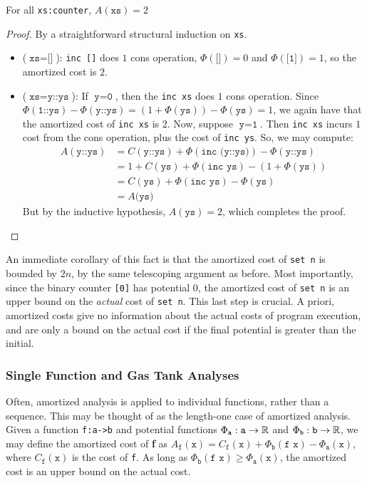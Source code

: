 \begin{theorem}
For all \texttt{xs:counter}, $A(\texttt{xs}) = 2$
\end{theorem}
\label{thm:bc-phys}
\begin{proof}
By a straightforward structural induction on \texttt{xs}.
\begin{itemize}
  \item ($\texttt{xs} = \texttt{[]}$): \texttt{inc []} does $1$ cons operation, $\Phi(\texttt{[]}) = 0$ and $\Phi(\texttt{[1]}) = 1$, so the amortized cost is $2$.
  \item ($\texttt{xs} = \texttt{y::ys}$): If $\texttt{y} = \texttt{0}$, then the \texttt{inc xs} does $1$ cons operation. Since $\Phi(\texttt{1::ys}) - \Phi(\texttt{y::ys}) = (1 + \Phi(\texttt{ys})) - \Phi(\texttt{ys}) = 1$, we again have that the amortized cost of \texttt{inc xs} is $2$. Now, suppose $\texttt{y} = \texttt{1}$. Then \texttt{inc xs} incurs $1$ cost from the cons operation, plus the cost of \texttt{inc ys}. So, we may compute:
  \begin{align*}
    A(\texttt{y::ys}) &= C(\texttt{y::ys}) + \Phi(\texttt{inc (y::ys)}) - \Phi(\texttt{y::ys})\\
    &= 1 + C(\texttt{ys}) + \Phi(\texttt{inc ys}) - (1 + \Phi(\texttt{ys}))\\
    &= C(\texttt{ys}) + \Phi(\texttt{inc ys}) - \Phi(\texttt{ys})\\
    &= A(\texttt{ys)}
  \end{align*}
  But by the inductive hypothesis, $A(\texttt{ys}) = 2$, which completes the proof.
\end{itemize}
\end{proof}

An immediate corollary of this fact is that the amortized cost of \texttt{set n} is bounded by $2n$, by the same telescoping argument as before. Most importantly, since the binary counter \texttt{[0]} has potential $0$, the amortized cost of \texttt{set n} is an upper bound on the \textit{actual} cost of \texttt{set n}. This last step is crucial. A priori, amortized costs give no information about the actual costs of program execution, and are only a bound on the actual cost if the final potential is greater than the initial.

\subsubsection{Single Function and Gas Tank Analyses}
Often, amortized analysis is applied to individual functions, rather than a sequence. This may be thought of as the length-one case of amortized analysis.
Given a function \texttt{f:a->b} and potential functions $\Phi_\texttt{a} : \texttt{a} \to \mathbb{R}$ and $\Phi_\texttt{b} : \texttt{b} \to \mathbb{R}$, we may define
the amortized cost of \textbf{f} as $A_\texttt{f}(\texttt{x}) = C_\texttt{f}(\texttt{x}) + \Phi_\texttt{b}(\texttt{f x}) - \Phi_\texttt{a}(\texttt{x})$,
where $C_\texttt{f}(\texttt{x})$ is the cost of \texttt{f}. As long as $\Phi_\texttt{b}(\texttt{f x}) \geq \Phi_\texttt{a}(\texttt{x})$, the amortized cost is an upper bound on the actual cost.

